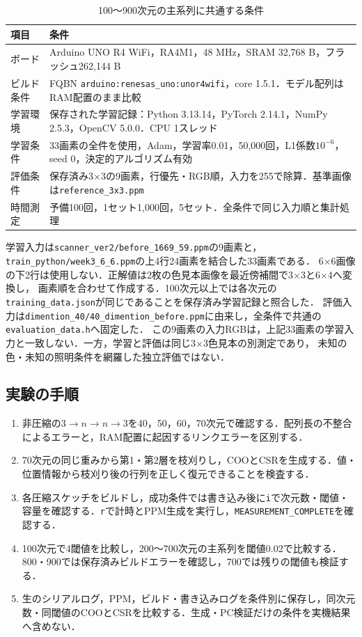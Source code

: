 \documentclass[a4paper,11pt]{article}
\newcommand{\code}[1]{\nolinkurl{#1}}
\begin{document}
\begin{table}[H]\centering\small
\caption{100〜900次元の主系列に共通する条件}\label{tab:common}
\renewcommand{\arraystretch}{1.15}
\begin{tabularx}{\linewidth}{p{35mm}Y}\toprule
項目&条件\\\midrule
ボード&Arduino UNO R4 WiFi，RA4M1，48 MHz，SRAM 32,768 B，フラッシュ262,144 B\cite{board}\\\midrule
ビルド条件&FQBN \code{arduino:renesas_uno:unor4wifi}，core 1.5.1．モデル配列はRAM配置のまま比較\\\midrule
学習環境&保存された学習記録：Python 3.13.14，PyTorch 2.14.1，NumPy 2.5.3，OpenCV 5.0.0．CPU 1スレッド\\\midrule
学習条件&33画素の全件を使用，Adam，学習率0.01，50,000回，L1係数$10^{-6}$，seed 0，決定的アルゴリズム有効\\\midrule
評価条件&保存済み3$\times$3の9画素，行優先・RGB順，入力を255で除算．基準画像は\code{reference_3x3.ppm}\\\midrule
時間測定&予備100回，1セット1,000回，5セット．全条件で同じ入力順と集計処理\\\bottomrule
\end{tabularx}\end{table}

学習入力は\code{scanner_ver2/before_1669_59.ppm}の9画素と，
\code{train_python/week3_6_6.ppm}の上4行24画素を結合した33画素である．
6$\times$6画像の下2行は使用しない．正解値は2枚の色見本画像を最近傍補間で3$\times$3と6$\times$4へ変換し，
画素順を合わせて作成する．100次元以上では各次元の\code{training_data.json}が同じであることを保存済み学習記録と照合した．
評価入力は\code{dimention_40/40_dimention_before.ppm}に由来し，全条件で共通の\code{evaluation_data.h}へ固定した．
この9画素の入力RGBは，上記33画素の学習入力と一致しない．一方，学習と評価は同じ3$\times$3色見本の別測定であり，
未知の色・未知の照明条件を網羅した独立評価ではない．

\subsection{実験の手順}

\begin{enumerate}[leftmargin=*,itemsep=2pt]
\item 非圧縮の$3\to n\to n\to3$を40，50，60，70次元で確認する．配列長の不整合によるエラーと，RAM配置に起因するリンクエラーを区別する．
\item 70次元の同じ重みから第1・第2層を枝刈りし，COOとCSRを生成する．値・位置情報から枝刈り後の行列を正しく復元できることを検査する．
\item 各圧縮スケッチをビルドし，成功条件では書き込み後に\code{i}で次元数・閾値・容量を確認する．\code{r}で計時とPPM生成を実行し，\code{MEASUREMENT_COMPLETE}を確認する．
\item 100次元で4閾値を比較し，200〜700次元の主系列を閾値0.02で比較する．800・900では保存済みビルドエラーを確認し，700では残りの閾値も検証する．
\item 生のシリアルログ，PPM，ビルド・書き込みログを条件別に保存し，同次元数・同閾値のCOOとCSRを比較する．生成・PC検証だけの条件を実機結果へ含めない．
\end{enumerate}
\end{document}
